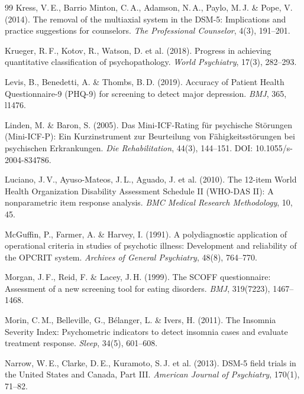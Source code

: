 \documentclass[11pt,a4paper]{article}
\begin{document}
\begin{thebibliography}{99}
Kress, V.\,E., Barrio Minton, C.\,A., Adamson, N.\,A., Paylo, M.\,J. \& Pope, V. (2014).
\newblock The removal of the multiaxial system in the DSM-5: Implications and practice suggestions for counselors.
\newblock \textit{The Professional Counselor}, 4(3), 191--201.

Krueger, R.\,F., Kotov, R., Watson, D. et al. (2018).
\newblock Progress in achieving quantitative classification of psychopathology.
\newblock \textit{World Psychiatry}, 17(3), 282--293.

Levis, B., Benedetti, A. \& Thombs, B.\,D. (2019).
\newblock Accuracy of Patient Health Questionnaire-9 (PHQ-9) for screening to detect major depression.
\newblock \textit{BMJ}, 365, l1476.

Linden, M. \& Baron, S. (2005).
\newblock Das Mini-ICF-Rating f\"ur psychische St\"orungen (Mini-ICF-P): Ein Kurzinstrument zur Beurteilung von F\"ahigkeitsst\"orungen bei psychischen Erkrankungen.
\newblock \textit{Die Rehabilitation}, 44(3), 144--151. DOI: 10.1055/s-2004-834786.

Luciano, J.\,V., Ayuso-Mateos, J.\,L., Aguado, J. et al. (2010).
\newblock The 12-item World Health Organization Disability Assessment Schedule II (WHO-DAS II): A nonparametric item response analysis.
\newblock \textit{BMC Medical Research Methodology}, 10, 45.

McGuffin, P., Farmer, A. \& Harvey, I. (1991).
\newblock A polydiagnostic application of operational criteria in studies of psychotic illness: Development and reliability of the OPCRIT system.
\newblock \textit{Archives of General Psychiatry}, 48(8), 764--770.

Morgan, J.\,F., Reid, F. \& Lacey, J.\,H. (1999).
\newblock The SCOFF questionnaire: Assessment of a new screening tool for eating disorders.
\newblock \textit{BMJ}, 319(7223), 1467--1468.

Morin, C.\,M., Belleville, G., B\'elanger, L. \& Ivers, H. (2011).
\newblock The Insomnia Severity Index: Psychometric indicators to detect insomnia cases and evaluate treatment response.
\newblock \textit{Sleep}, 34(5), 601--608.

Narrow, W.\,E., Clarke, D.\,E., Kuramoto, S.\,J. et al. (2013).
\newblock DSM-5 field trials in the United States and Canada, Part III.
\newblock \textit{American Journal of Psychiatry}, 170(1), 71--82.


\end{thebibliography}
\end{document}

